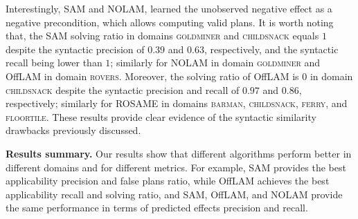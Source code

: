 \documentclass[letterpaper]{article} %
\newcommand{\sam}{\ac{SAM}\xspace}
\newcommand{\nolam}{NOLAM\xspace}
\newcommand{\offlam}{OffLAM\xspace}
\newcommand{\rosame}{ROSAME\xspace}
\newcommand{\samshort}{SAM\xspace}
\newcommand{\miniparagraph}[1]{\textbf{#1.}}
\newif\ifaddcomments
\newcommand{\roni}[1]{\ifaddcomments{\textcolor{red}{[Roni: #1]}}\fi}
\newcommand{\leo}[1]{\ifaddcomments{\textcolor{pink}{[Leonardo: #1]}}\fi}
\begin{document}
Interestingly, \samshort and \nolam, learned the unobserved negative effect as a negative precondition, which allows computing valid plans.
%
It is worth noting that, the \samshort solving ratio in domains \textsc{goldminer} and \textsc{childsnack} equals $1$ despite the syntactic precision of $0.39$ and $0.63$, respectively, and the syntactic recall being lower than $1$; similarly for \nolam in domain \textsc{goldminer} and \offlam in domain \textsc{rovers}. 
Moreover, the solving ratio of \offlam is $0$ in domain \textsc{childsnack} despite the syntactic precision and recall of  $0.97$ and $0.86$, respectively; similarly for \rosame in domains \textsc{barman}, \textsc{childsnack}, \textsc{ferry}, and \textsc{floortile}. 
%
These results provide clear evidence of the syntactic similarity drawbacks previously discussed.






\miniparagraph{Results summary} 
Our results show that different algorithms perform better in different domains and for different metrics. 
For example, \sam provides the best applicability precision and false plans ratio, while \offlam achieves the best applicability recall and solving ratio, and \sam, \offlam, and \nolam provide the same performance in terms of predicted effects precision and recall. 
\end{document}
